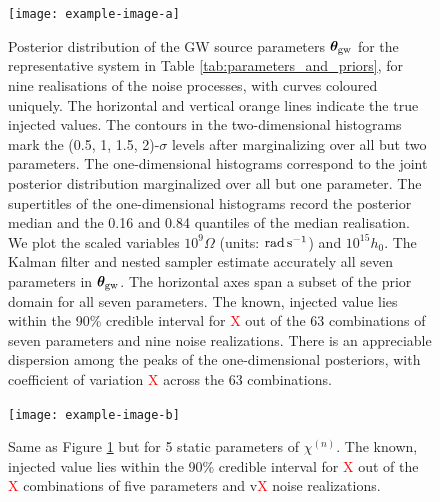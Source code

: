 \documentclass[fleqn,usenatbib,useAMS]{mnras}
\begin{document}
\begin{figure}
	\texttt{[image: example-image-a]}
	\caption{Posterior distribution of the GW source parameters $\boldsymbol{\theta}_{\rm gw}$ for the representative system in Table \ref{tab:parameters_and_priors}, for nine realisations of the noise processes, with curves coloured uniquely. The horizontal and vertical orange lines indicate the true injected values. The contours in the two-dimensional histograms mark the (0.5, 1, 1.5, 2)-$\sigma$ levels after marginalizing over all but two parameters. The one-dimensional histograms correspond to the joint posterior distribution marginalized over all but one parameter. The supertitles of the one-dimensional histograms record the posterior median and the 0.16 and 0.84 quantiles of the median realisation. We plot the scaled variables $10^9 \Omega$ (units: ${\rm rad \, s^{-1}}$) and $10^{15} h_0$. The Kalman filter and nested sampler estimate accurately all seven parameters in ${\boldsymbol{\theta}}_{\rm gw}$. The horizontal axes span a subset of the prior domain for all seven parameters. The known, injected value lies within the 90\% credible interval for \textcolor{red}{X} out of the 63 combinations of seven parameters and nine noise realizations. There is an appreciable dispersion among the peaks of the one-dimensional posteriors, with coefficient of variation \textcolor{red}{X} across the 63 combinations.}
	\label{fig:corner_plot_1}
\end{figure}

	\begin{figure}
	\texttt{[image: example-image-b]}
	\caption{Same as Figure \ref{fig:corner_plot_1}	but for 5 static parameters of $\chi^{(n)}$. The known, injected value lies within the 90\% credible interval for \textcolor{red}{X} out of the \textcolor{red}{X} combinations of five parameters and v\textcolor{red}{X} noise realizations. }
	\label{fig:corner_plot_3}
\end{figure}
\end{document}
